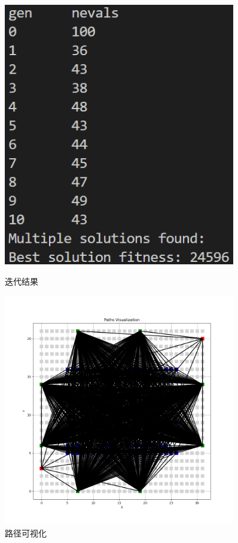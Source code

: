 \documentclass[withoutpreface,bwprint]{thesis-config}
\begin{document}
    \begin{figure}[!htbp]
        \centering
        \begin{minipage}[b]{0.4\linewidth}
            \centering
            \includegraphics[width=0.9\textwidth]{figures/3.3.png}
            \caption{迭代结果}
        \end{minipage}%
        \begin{minipage}[b]{0.53\linewidth}
            \centering
            \includegraphics[width=0.9\textwidth]{figures/3.4.png}
            \caption{路径可视化}
        \end{minipage}%
    \end{figure}
\end{document}
